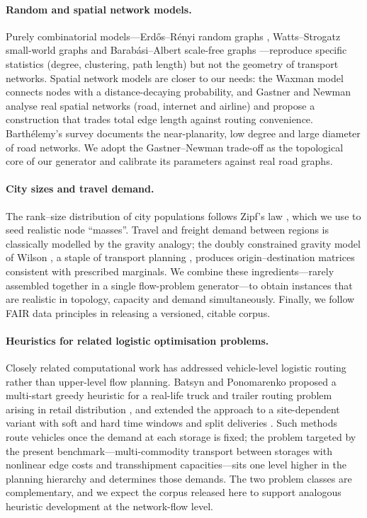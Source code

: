 \documentclass[runningheads]{llncs}
\begin{document}
\paragraph{Random and spatial network models.}
Purely combinatorial models---Erd\H{o}s--R\'enyi random graphs \cite{er},
Watts--Strogatz small-world graphs \cite{ws} and Barab\'asi--Albert scale-free
graphs \cite{ba}---reproduce specific statistics (degree, clustering, path
length) but not the geometry of transport networks. Spatial network models are
closer to our needs: the Waxman model \cite{waxman} connects nodes with a
distance-decaying probability, and Gastner and Newman \cite{gastner2006} analyse
real spatial networks (road, internet and airline) and propose a construction
that trades total edge length against routing convenience. Barth\'elemy's survey
\cite{barthelemy2011} documents the near-planarity, low degree and large
diameter of road networks. We adopt the Gastner--Newman trade-off as the
topological core of our generator and calibrate its parameters against real road
graphs.

\paragraph{City sizes and travel demand.}
The rank--size distribution of city populations follows Zipf's law
\cite{gabaix1999}, which we use to seed realistic node ``masses''. Travel and
freight demand between regions is classically modelled by the gravity analogy;
the doubly constrained gravity model of Wilson \cite{wilson1967}, a staple of
transport planning \cite{ortuzar}, produces origin--destination matrices
consistent with prescribed marginals. We combine these ingredients---rarely
assembled together in a single flow-problem generator---to obtain instances that
are realistic in topology, capacity and demand simultaneously. Finally, we
follow FAIR data principles \cite{fair} in releasing a versioned, citable
corpus.

\paragraph{Heuristics for related logistic optimisation problems.}
Closely related computational work has addressed vehicle-level logistic routing
rather than upper-level flow planning. Batsyn and Ponomarenko proposed a
multi-start greedy heuristic for a real-life truck and trailer routing problem
arising in retail distribution \cite{batsyn2014ttrp}, and extended the approach
to a site-dependent variant with soft and hard time windows and split deliveries
\cite{batsyn2015heuristic}. Such methods route vehicles once the demand at each
storage is fixed; the problem targeted by the present benchmark---multi-commodity
transport between storages with nonlinear edge costs and transshipment
capacities---sits one level higher in the planning hierarchy and determines
those demands. The two problem classes are complementary, and we expect the
corpus released here to support analogous heuristic development at the
network-flow level.
\end{document}
